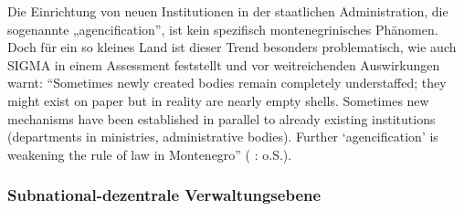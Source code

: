 Die Einrichtung von neuen Institutionen in der staatlichen Administration, die sogenannte „agencification”, ist kein spezifisch montenegrinisches Phänomen. Doch für ein so kleines Land ist dieser Trend besonders problematisch, wie auch SIGMA in einem Assessment feststellt und vor weitreichenden Auswirkungen warnt: “Sometimes newly created bodies remain completely understaffed; they might exist on paper but in reality are nearly empty shells. Sometimes new mechanisms have been established in parallel to already existing institutions (departments in ministries, administrative bodies). Further ‘agencification’ is weakening the rule of law in Montenegro” ( \cite{oecd11a}: o.S.).

\subsubsection{Subnational-dezentrale Verwaltungsebene}

